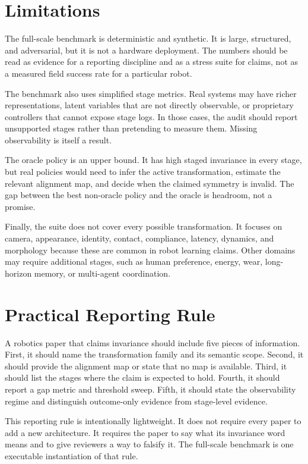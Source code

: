 \documentclass{article}
\begin{document}
\section{Limitations}

The full-scale benchmark is deterministic and synthetic. It is large, structured, and adversarial, but it is not a hardware deployment. The numbers should be read as evidence for a reporting discipline and as a stress suite for claims, not as a measured field success rate for a particular robot.

The benchmark also uses simplified stage metrics. Real systems may have richer representations, latent variables that are not directly observable, or proprietary controllers that cannot expose stage logs. In those cases, the audit should report unsupported stages rather than pretending to measure them. Missing observability is itself a result.

The oracle policy is an upper bound. It has high staged invariance in every stage, but real policies would need to infer the active transformation, estimate the relevant alignment map, and decide when the claimed symmetry is invalid. The gap between the best non-oracle policy and the oracle is headroom, not a promise.

Finally, the suite does not cover every possible transformation. It focuses on camera, appearance, identity, contact, compliance, latency, dynamics, and morphology because these are common in robot learning claims. Other domains may require additional stages, such as human preference, energy, wear, long-horizon memory, or multi-agent coordination.

\section{Practical Reporting Rule}

A robotics paper that claims invariance should include five pieces of information. First, it should name the transformation family and its semantic scope. Second, it should provide the alignment map or state that no map is available. Third, it should list the stages where the claim is expected to hold. Fourth, it should report a gap metric and threshold sweep. Fifth, it should state the observability regime and distinguish outcome-only evidence from stage-level evidence.

This reporting rule is intentionally lightweight. It does not require every paper to add a new architecture. It requires the paper to say what its invariance word means and to give reviewers a way to falsify it. The full-scale benchmark is one executable instantiation of that rule.
\end{document}
